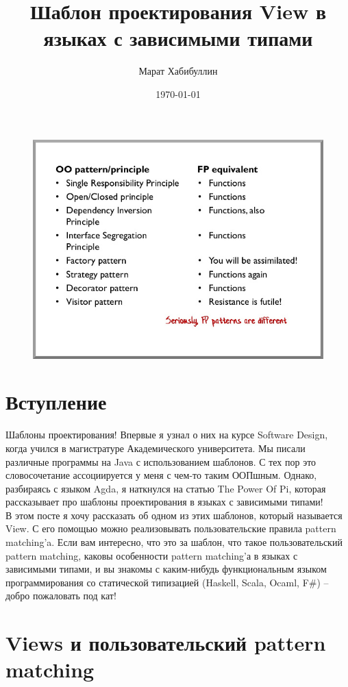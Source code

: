 \documentclass[8pt]{extarticle}
\title{Шаблон проектирования View в языках с зависимыми типами}
\author{Марат Хабибуллин}
\date{\today}
\begin{document}
\maketitle

\begin{figure}[!htbp]
\centering
\includegraphics[width=1\textwidth]{fp_patterns.jpg}
\end{figure}

\section{Вступление}

Шаблоны проектирования! Впервые я узнал о них на курсе Software Design, когда учился в магистратуре Академического университета. Мы писали различные программы на Java с использованием шаблонов. С тех пор это словосочетание ассоциируется у меня с чем-то таким ООПшным. Однако, разбираясь с языком Agda, я наткнулся на статью The Power Of Pi, которая рассказывает про шаблоны проектирования в языках с зависимыми типами!\\
В этом посте я хочу рассказать об одном из этих шаблонов, который называется View. С его помощью можно реализовывать пользовательские правила pattern matching'a. Если вам интересно, что это за шаблон, что такое пользовательский pattern matching, каковы особенности pattern matching'а в языках с зависимыми типами, и вы знакомы с каким-нибудь функциональным языком программирования со статической типизацией (Haskell, Scala, Ocaml, F\#) -- добро пожаловать под кат!


\section{Views и пользовательский pattern matching}
\end{document}
